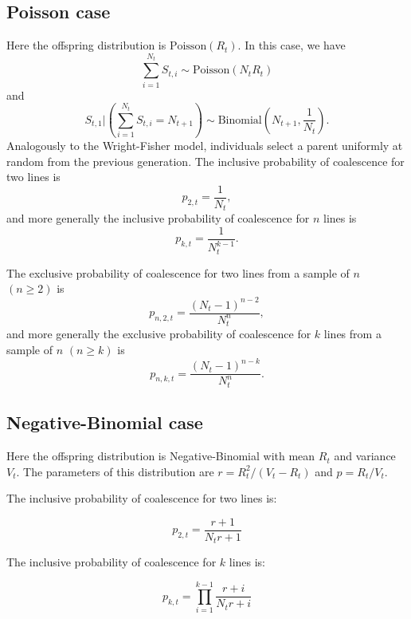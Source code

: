 \documentclass{article}
\begin{document}
\subsection{Poisson case}

Here the offspring distribution is $\text{Poisson}(R_t)$.
In this case, we have 
	\[
		\sum_{i=1}^{N_t} S_{t,i} \sim \text{Poisson}(N_t R_t)
	\]
and
	\[
		S_{t,1} | (\sum_{i=1}^{N_t} S_{t,i} = N_{t+1}) \sim \text{Binomial}(N_{t+1}, \frac{1}{N_t}).
	\]
Analogously to the Wright-Fisher model, individuals select a parent uniformly at random from the previous generation.
The inclusive probability of coalescence for two lines is
%
\begin{equation}
	p_{2,t}=\frac{1}{N_t},
\end{equation}
and more generally the inclusive probability of coalescence for $n$ lines is
\begin{equation}
	p_{k,t}=\frac{1}{N_t^{k-1}}.
\end{equation}

The exclusive probability of coalescence for two lines from a sample of $n$ $(n \geq 2)$ is
	\begin{equation}
		p_{n,2,t} = \frac{(N_t-1)^{n-2}}{N_t^n},
	\end{equation}
and more generally the exclusive probability of coalescence for $k$ lines from a sample of $n$ $(n \geq k)$ is
	\begin{equation}
		p_{n,k,t} = \frac{(N_t-1)^{n-k}}{N_t^n}.
	\end{equation}

\subsection{Negative-Binomial case}

Here the offspring distribution is Negative-Binomial with mean $R_t$ and variance $V_t$.
The parameters of this distribution are 
$r=R_t^2/(V_t-R_t)$ and $p=R_t/V_t$.

The inclusive probability of coalescence for two lines is:

\begin{equation}
p_{2,t}=\frac{r+1}{N_t r+1}
\end{equation}

The inclusive probability of coalescence for $k$ lines is:

\begin{equation}
p_{k,t}=\prod_{i=1}^{k-1}\frac{r+i}{N_t r+i}
\end{equation}
\end{document}
